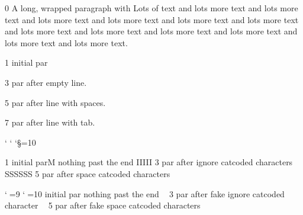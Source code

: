 \documentclass{article}
\begin{document}
0 A long, wrapped paragraph with Lots of text
and lots more text  and lots more text  and lots more text  and lots more text
and lots more text  and lots more text  and lots more text  and lots more text
and lots more text  and lots more text  and lots more text  and lots more text.

1 initial par

3 par after empty line.
        
5 par after line with spaces.
	
7 par after line with tab.
	

{
  \catcode`\relax %
  \catcode`\relax %
  \catcode`\S=10\relax %

1 initial parM nothing past the end
IIIII
3 par after ignore catcoded characters
SSSSSS
5 par after space catcoded characters
}

{
  \catcode`^^Q=9\relax %
\catcode`^^R=10 initial par^^M nothing past the end
^^Q^^Q
3 par after fake ignore catcoded character
^^R^^R
5 par after fake space catcoded characters
}
\end{document}
